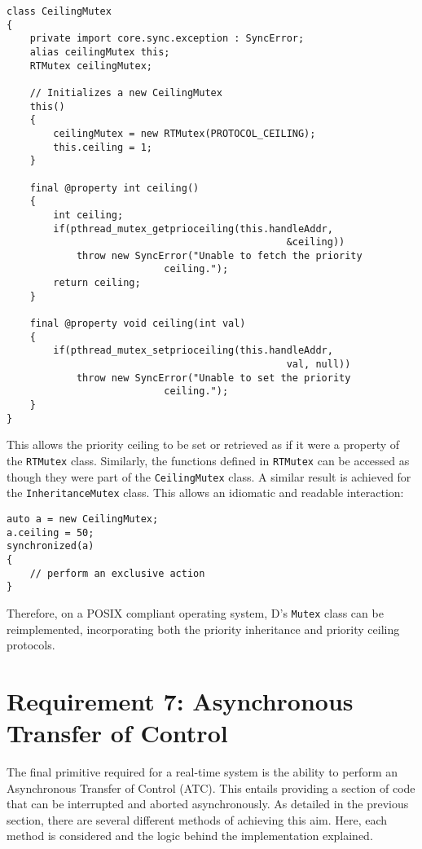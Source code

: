 \begin{lstlisting}[basicstyle=\small]
class CeilingMutex 
{
    private import core.sync.exception : SyncError;
    alias ceilingMutex this;
    RTMutex ceilingMutex;

    // Initializes a new CeilingMutex
    this()
    {
        ceilingMutex = new RTMutex(PROTOCOL_CEILING);
        this.ceiling = 1;
    }

    final @property int ceiling()
    {
        int ceiling; 
        if(pthread_mutex_getprioceiling(this.handleAddr, 
                                                &ceiling))
            throw new SyncError("Unable to fetch the priority 
                           ceiling."); 
        return ceiling; 
    }

    final @property void ceiling(int val)
    {
        if(pthread_mutex_setprioceiling(this.handleAddr, 
                                                val, null))
            throw new SyncError("Unable to set the priority 
                           ceiling."); 
    }
}
\end{lstlisting}
This allows the priority ceiling to be set or retrieved as if it were a property of 
the \texttt{RTMutex} class. Similarly, the functions defined in \texttt{RTMutex} 
can be accessed as though they were part of the \texttt{CeilingMutex} class. 
A similar result is achieved for the \texttt{InheritanceMutex} class.
This allows an idiomatic and readable interaction: 
\begin{lstlisting}[basicstyle=\small]
auto a = new CeilingMutex;
a.ceiling = 50; 
synchronized(a) 
{
    // perform an exclusive action
}
\end{lstlisting}
Therefore, on a POSIX compliant operating system, D's \texttt{Mutex} class can 
be reimplemented, incorporating both the priority inheritance and 
priority ceiling protocols. 

\section{Requirement 7: Asynchronous Transfer of Control} %
The final primitive required for a real-time system is the ability to perform an Asynchronous Transfer of 
Control (ATC). This entails providing a section of code that can be interrupted 
and aborted asynchronously.
As detailed in the previous section, there are several different methods of 
achieving this aim. Here, each method is considered and the logic behind the 
implementation explained. 

